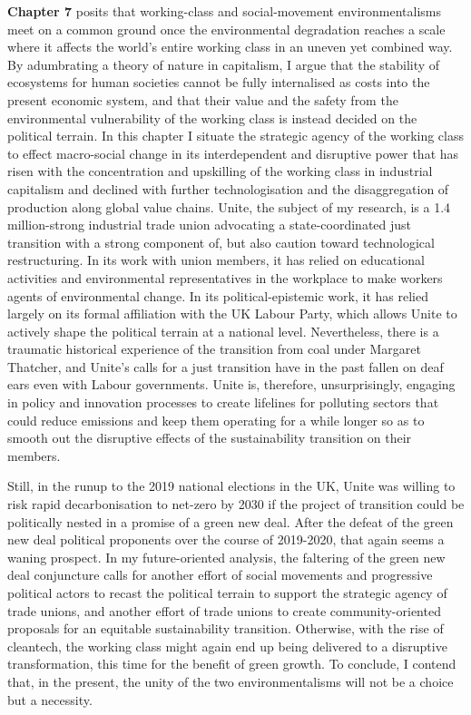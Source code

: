 \documentclass[a4paper, nobind]{templates/ociamthesis}
\begin{document}
\textbf{Chapter 7} posits that working-class and social-movement environmentalisms meet on a common ground once the environmental degradation reaches a scale where it affects the world's entire working class in an uneven yet combined way. By adumbrating a theory of nature in capitalism, I argue that the stability of ecosystems for human societies cannot be fully internalised as costs into the present economic system, and that their value and the safety from the environmental vulnerability of the working class is instead decided on the political terrain. In this chapter I situate the strategic agency of the working class to effect macro-social change in its interdependent and disruptive power that has risen with the concentration and upskilling of the working class in industrial capitalism and declined with further technologisation and the disaggregation of production along global value chains. Unite, the subject of my research, is a 1.4 million-strong industrial trade union advocating a state-coordinated just transition with a strong component of, but also caution toward technological restructuring. In its work with union members, it has relied on educational activities and environmental representatives in the workplace to make workers agents of environmental change. In its political-epistemic work, it has relied largely on its formal affiliation with the UK Labour Party, which allows Unite to actively shape the political terrain at a national level. Nevertheless, there is a traumatic historical experience of the transition from coal under Margaret Thatcher, and Unite's calls for a just transition have in the past fallen on deaf ears even with Labour governments. Unite is, therefore, unsurprisingly, engaging in policy and innovation processes to create lifelines for polluting sectors that could reduce emissions and keep them operating for a while longer so as to smooth out the disruptive effects of the sustainability transition on their members.

Still, in the runup to the 2019 national elections in the UK, Unite was willing to risk rapid decarbonisation to net-zero by 2030 if the project of transition could be politically nested in a promise of a green new deal. After the defeat of the green new deal political proponents over the course of 2019-2020, that again seems a waning prospect. In my future-oriented analysis, the faltering of the green new deal conjuncture calls for another effort of social movements and progressive political actors to recast the political terrain to support the strategic agency of trade unions, and another effort of trade unions to create community-oriented proposals for an equitable sustainability transition. Otherwise, with the rise of cleantech, the working class might again end up being delivered to a disruptive transformation, this time for the benefit of green growth. To conclude, I contend that, in the present, the unity of the two environmentalisms will not be a choice but a necessity.
\end{document}
